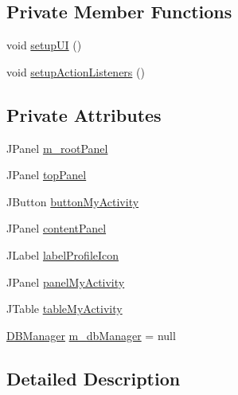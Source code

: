 \subsection*{Private Member Functions}
\begin{DoxyCompactItemize}
\item 
void \mbox{\hyperlink{classcom_1_1activitytracker_1_1_main_window_a53a019623a37b950473359fc625b6423}{setup\+UI}} ()
\item 
void \mbox{\hyperlink{classcom_1_1activitytracker_1_1_main_window_a76b3e8567b228ccd26f09c15ebaddb72}{setup\+Action\+Listeners}} ()
\end{DoxyCompactItemize}
\subsection*{Private Attributes}
\begin{DoxyCompactItemize}
\item 
J\+Panel \mbox{\hyperlink{classcom_1_1activitytracker_1_1_main_window_ac3d61c032aef87f12b1ae6f7dbf482c3}{m\+\_\+root\+Panel}}
\item 
J\+Panel \mbox{\hyperlink{classcom_1_1activitytracker_1_1_main_window_a6baf76b2b8ede1ba82fc6d096ddb580b}{top\+Panel}}
\item 
J\+Button \mbox{\hyperlink{classcom_1_1activitytracker_1_1_main_window_adec15801f8e16f769bd954e351a663fa}{button\+My\+Activity}}
\item 
J\+Panel \mbox{\hyperlink{classcom_1_1activitytracker_1_1_main_window_aaa5ce3b10bff65231c65a3d4b33724b0}{content\+Panel}}
\item 
J\+Label \mbox{\hyperlink{classcom_1_1activitytracker_1_1_main_window_a05a555ba49d30b00573d07e5acd39e0a}{label\+Profile\+Icon}}
\item 
J\+Panel \mbox{\hyperlink{classcom_1_1activitytracker_1_1_main_window_a89833c824727a496f4a889177d4d3f3c}{panel\+My\+Activity}}
\item 
J\+Table \mbox{\hyperlink{classcom_1_1activitytracker_1_1_main_window_a0ad6d3ca1298275eba15a9ea189d4d9b}{table\+My\+Activity}}
\item 
\mbox{\hyperlink{classcom_1_1activitytracker_1_1_d_b_manager}{D\+B\+Manager}} \mbox{\hyperlink{classcom_1_1activitytracker_1_1_main_window_ab2af51cb35794567e55564a4d3abbb79}{m\+\_\+db\+Manager}} = null
\end{DoxyCompactItemize}


\subsection{Detailed Description}


